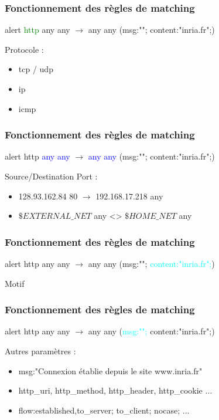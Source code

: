 \documentclass{beamer}
\begin{document}
\begin{frame}
\frametitle{Fonctionnement des règles de matching}
\begin{block}{}
alert \textcolor{green}{http} any any $\rightarrow$ any any (msg:""; content:"inria.fr";)
\end{block}
Protocole :
\begin{itemize}
[triangle]
\item tcp / udp
\item ip
\item icmp
\end{itemize}
\end{frame}

\begin{frame}
\frametitle{Fonctionnement des règles de matching}
\begin{block}{}
alert http \textcolor{blue}{any any}  $\rightarrow$ \textcolor{blue}{any any} (msg:""; content:"inria.fr";)
\end{block}
Source/Destination Port :
\begin{itemize}
[triangle]
\item 128.93.162.84 80 $\rightarrow$ 192.168.17.218 any
\item $\$EXTERNAL\_NET$ any <> $\$HOME\_NET$ any
\end{itemize}
\end{frame}

\begin{frame}
\frametitle{Fonctionnement des règles de matching}
\begin{block}{}
alert http any any $\rightarrow$ any any (msg:""; \textcolor{cyan}{content:"inria.fr";})
\end{block}
\begin{center}
Motif
\end{center}
\end{frame}

\begin{frame}
\frametitle{Fonctionnement des règles de matching}
\begin{block}{}
alert http any any $\rightarrow$ any any (\textcolor{cyan}{msg:"";} content:"inria.fr";)
\end{block}
Autres paramètres :
\begin{itemize}
[triangle]
\item msg:"Connexion établie depuis le site www.inria.fr"
\item http\_uri, http\_method, http\_header, http\_cookie $\ldots$
\item flow:established,to\_server; to\_client; nocase; $\ldots$
\end{itemize}
\end{frame}
\end{document}
